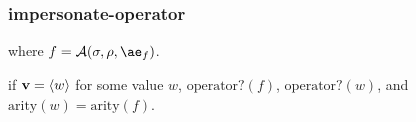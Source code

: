 \documentclass{sigplanconf}
\begin{document}









\subsubsection{impersonate-operator}


\noindent
{}

\noindent
where $f=\A{\sigma}{\rho}{\ae_f}$.

\noindent
{}

\noindent
if $\mathbf{v}=\langle w\rangle$ for some value $w$, $\mathrm{operator?}(f)$, $\mathrm{operator?}(w)$, and $\mathrm{arity}(w)=\mathrm{arity}(f)$.
\end{document}
